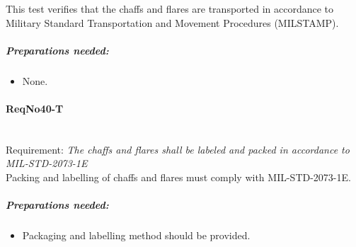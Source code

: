 This test verifies that the chaffs and flares are transported in accordance to Military Standard Transportation and Movement Procedures (MILSTAMP).
	\subparagraph{Preparations needed:}
	\begin{itemize}
	\item None. 
	\end{itemize}

\paragraph{ReqNo40-T}\mbox{}\\ %
Requirement: \textit{The chaffs and flares shall be labeled and packed in accordance to MIL-STD-2073-1E}\\
Packing and labelling of chaffs and flares must comply with MIL-STD-2073-1E.

	\subparagraph{Preparations needed:}
	\begin{itemize}
	\item Packaging and labelling method should be provided. 
	\end{itemize}
